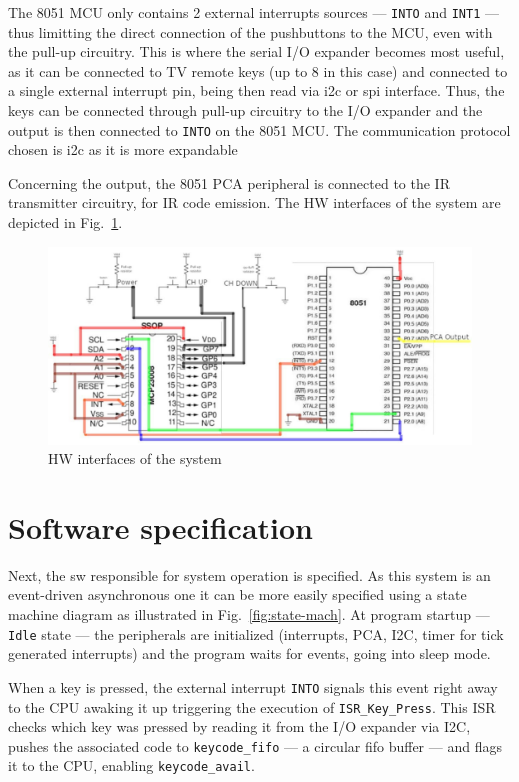The 8051 MCU only contains 2 external interrupts sources --- \texttt{INTO} and
\texttt{INT1} --- thus limitting the direct connection of the pushbuttons to the
MCU, even with the pull-up circuitry. This is where the serial I/O expander
becomes most useful, as it can be connected to TV remote keys (up to 8 in this
case) and connected to a single external interrupt pin, being then read via
\gls{i2c} or \gls{spi} interface. Thus, the keys can be connected through
pull-up circuitry to the I/O expander and the output is then connected to
\texttt{INTO} on the 8051 MCU. The communication protocol chosen is \gls{i2c} as
it is more expandable

Concerning the output, the 8051 PCA peripheral is connected to the IR
transmitter circuitry, for IR code emission. The HW interfaces of the system are
depicted in Fig.~\ref{fig:hw-interfaces}.
%
  \vspace{-5mm}
%  
\begin{figure}[htb!]
\centering
    \includegraphics[width=1.0\columnwidth]{./img/hw-interfaces.jpg}
  \caption{HW interfaces of the system}%
\label{fig:hw-interfaces}
\end{figure}
%
%
  \vspace{-5mm}
%  
\section{Software specification}
\label{sec:sw-specs}
Next, the \gls{sw} responsible for system operation is specified. As this system
is an event-driven asynchronous one it can be more easily specified using a
state machine diagram as illustrated in Fig.~\ref{fig:state-mach}. At program
startup --- \texttt{Idle} state --- the peripherals are initialized (interrupts, PCA, I2C, timer for tick
generated interrupts) and the program waits for events, going into sleep
mode.

When a key is pressed, the external interrupt \texttt{INTO} signals this
event right away to the CPU awaking it up triggering the execution of
\texttt{ISR\_Key\_Press}. This ISR checks which key was pressed by reading it
from the I/O expander via I2C, pushes the associated code to
\texttt{keycode\_fifo} --- a circular \gls{fifo} buffer --- and flags it to the CPU, enabling \texttt{keycode\_avail}.

